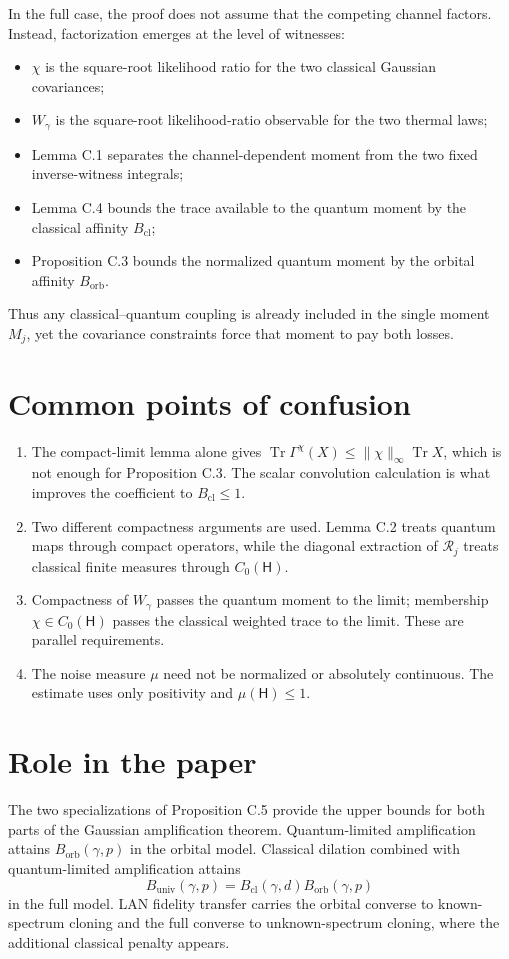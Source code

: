 \documentclass[11pt]{article}
\newcommand{\Hc}{\mathsf H}
\newcommand{\Tr}{\operatorname{Tr}}
\newcommand{\Bcl}{B_{\mathrm{cl}}}
\newcommand{\Borb}{B_{\mathrm{orb}}}
\newcommand{\Buniv}{B_{\mathrm{univ}}}
\begin{document}
In the full case, the proof does not assume that the competing channel
factors.  Instead, factorization emerges at the level of witnesses:
\begin{itemize}
  \item $\chi$ is the square-root likelihood ratio for the two classical
  Gaussian covariances;
  \item $W_\gamma$ is the square-root likelihood-ratio observable for the two
  thermal laws;
  \item Lemma C.1 separates the channel-dependent moment from the two fixed
  inverse-witness integrals;
  \item Lemma C.4 bounds the trace available to the quantum moment by the
  classical affinity $\Bcl$;
  \item Proposition C.3 bounds the normalized quantum moment by the orbital
  affinity $\Borb$.
\end{itemize}
Thus any classical--quantum coupling is already included in the single
moment $M_j$, yet the covariance constraints force that moment to pay both
losses.

\section{Common points of confusion}

\begin{enumerate}
  \item The compact-limit lemma alone gives
  $\Tr\Gamma^\chi(X)\leq\|\chi\|_\infty\Tr X$, which is not enough for
  Proposition C.3.  The scalar convolution calculation is what improves the
  coefficient to $\Bcl\leq1$.
  \item Two different compactness arguments are used.  Lemma C.2 treats
  quantum maps through compact operators, while the diagonal extraction of
  $\mathcal R_j$ treats classical finite measures through $C_0(\Hc)$.
  \item Compactness of $W_\gamma$ passes the quantum moment to the limit;
  membership $\chi\in C_0(\Hc)$ passes the classical weighted trace to the
  limit.  These are parallel requirements.
  \item The noise measure $\mu$ need not be normalized or absolutely
  continuous.  The estimate uses only positivity and
  $\mu(\Hc)\leq1$.
\end{enumerate}

\section{Role in the paper}

The two specializations of Proposition C.5 provide the upper bounds for both
parts of the Gaussian amplification theorem.  Quantum-limited amplification
attains $\Borb(\gamma,p)$ in the orbital model.  Classical dilation combined
with quantum-limited amplification attains
\[
  \Buniv(\gamma,p)
  =\Bcl(\gamma,d)\Borb(\gamma,p)
\]
in the full model.  LAN fidelity transfer carries the orbital converse to
known-spectrum cloning and the full converse to unknown-spectrum cloning,
where the additional classical penalty appears.
\end{document}

